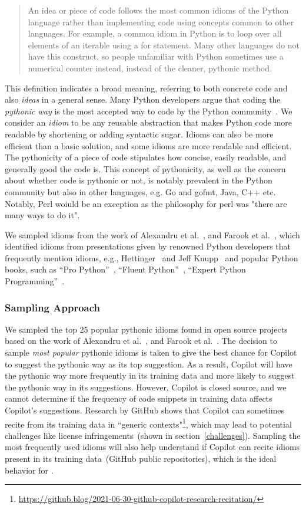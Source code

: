 \begin{quote}
    An idea or piece of code follows the most common idioms of the Python language rather than implementing code using concepts common to other languages. For example, a common idiom in Python is to loop over all elements of an iterable using a for statement. Many other languages do not have this construct, so people unfamiliar with Python sometimes use a numerical counter instead, instead of the cleaner, pythonic method.
\end{quote}

This definition indicates a broad meaning, referring to both concrete code and also \emph{ideas} in a general sense. Many Python developers argue that coding the \emph{pythonic way} is the most accepted way to code by the Python community~\cite{Alexandru2018}. 
We consider an \emph{idiom} to be any reusable abstraction that makes Python code more readable by shortening or adding syntactic sugar. Idioms can also be more efficient than a basic solution, and some idioms are more readable and efficient.
The pythonicity of a piece of code stipulates how concise, easily readable, and generally good the code is. This concept of pythonicity, as well as the concern about whether code is pythonic or not, is notably prevalent in the Python community but also in other languages, e.g. Go and gofmt, Java, C++ etc. Notably, Perl woiuld be an exception as the philosophy for perl was "there are many ways to do it".



We sampled idioms from the work of Alexandru et al.~\cite{Alexandru2018}, and Farook et al.~\cite{idioms}, which identified idioms from presentations given by renowned Python developers that frequently mention idioms, e.g., Hettinger~\cite{hettinger} and Jeff Knupp~\cite{knupp} and 
popular Python books, such as ``Pro Python''~\cite{Alchin2010}, ``Fluent Python''~\cite{fluent}, ``Expert Python Programming''~\cite{expert}.


\subsubsection{Sampling Approach}
\label{sampling}
We sampled the top 25 popular pythonic idioms found in open source projects based on the work of Alexandru et al.~\cite{Alexandru2018}, and Farook et al.~\cite{idioms}.
The decision to sample \emph{most popular} pythonic idioms is taken to give the best chance for Copilot to suggest the pythonic way as its top suggestion. As a result, Copilot will have the pythonic way more frequently in its training data and more likely to suggest the pythonic way in its suggestions.
However, Copilot is closed source, and we cannot determine if the frequency of code snippets in training data affects Copilot's suggestions. Research by GitHub shows that Copilot can sometimes recite from its training data in ``generic contexts"\footnote{\url{https://github.blog/2021-06-30-github-copilot-research-recitation/}}, which may lead to potential challenges like license infringements~(shown in section~\ref{challenges}). 
Sampling the most frequently used idioms will also help understand if Copilot can recite idioms present in its training data~(GitHub public repositories), which is the ideal behavior for \cct{}.
